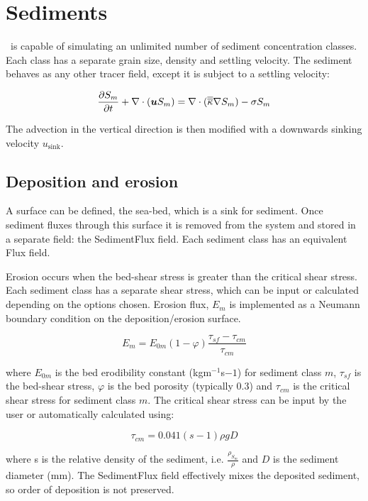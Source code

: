 \section{Sediments}

\fluidity\ is capable of simulating an unlimited number of sediment concentration classes.
Each class has a separate grain size, density and settling velocity. The sediment behaves
as any other tracer field, except it is subject to a settling velocity:

\begin{equation}\label{eq:sediment_conc}
\frac{\partial S_m}{\partial t} + \nabla\cdot({\mbox{\boldmath$u$}} S_m) = \nabla\cdot(\overline{\overline{\kappa}}\nabla S_m) - \sigma S_m
\end{equation}

The advection in the vertical direction is then modified with a downwards sinking 
velocity $u_{\mathrm{sink}}$. 

\subsection{Deposition and erosion}

A surface can be defined, the sea-bed, which is a sink for sediment. Once sediment
fluxes through this surface it is removed from the system and stored in a separate 
field: the SedimentFlux field. Each sediment class has an equivalent Flux field.

Erosion occurs when the bed-shear stress is greater than the critical shear stress. Each
sediment class has a separate shear stress, which can be input or calculated depending
on the options chosen. Erosion flux, $E_m$ is implemented as a Neumann boundary condition
on the deposition/erosion surface.

\begin{equation}\label{eq:sediment_erosion_rate}
E_m = E_{0m}\left(1-\varphi\right)\frac{\tau_{sf} - \tau_{cm}}{\tau_{cm}}
\end{equation}

\noindent
where $E_{0m}$ is the bed erodibility constant (kgm$^{-1}$s${-1}$) for sediment class $m$,
$\tau_{sf}$ is the bed-shear stress, $\varphi$ is the bed porosity (typically 0.3)
and $\tau_{cm}$ is the critical shear stress
for sediment class $m$. The critical shear stress can be input by the user or 
automatically calculated using:

\begin{equation}\label{eq:critical_shear_stress}
\tau_{cm} = 0.041\left(s-1\right)\rho gD
\end{equation}

\noindent
where s is the relative density of the sediment, i.e. $\frac{\rho_{S_{m}}}{\rho}$ and $D$ is the sediment
diameter (mm). The SedimentFlux field effectively mixes the deposited sediment, so order of deposition
is not preserved.

